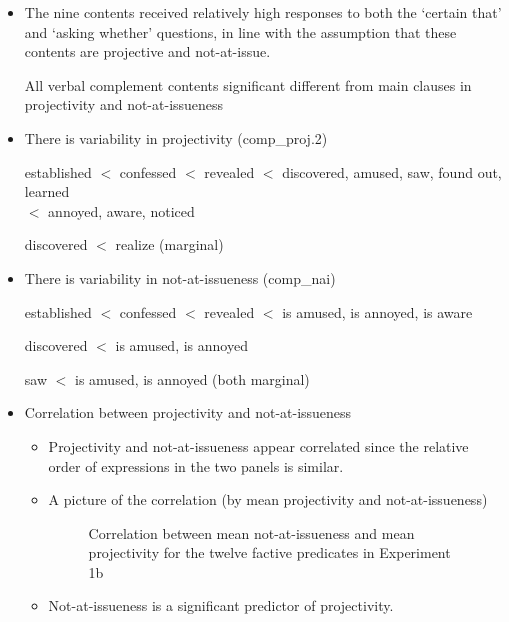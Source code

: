 \documentclass[11pt,fleqn]{article}
\newcommand{\6}{\mbox{$[\hspace*{-.6mm}[$}}
\newcommand{\9}{\mbox{$]\hspace*{-.6mm}]$}}
\begin{document}
\begin{itemize}

\item The nine contents received relatively high responses to both the `certain that' and `asking whether' questions, in line with the assumption that these contents are projective and not-at-issue. 

All verbal complement contents significant different from main clauses in projectivity and not-at-issueness

\item There is variability in projectivity (comp\_proj.2)

established $<$ confessed $<$ revealed $<$ discovered, amused, saw, found out, learned \\ \hspace*{.2cm} \hfill $<$ annoyed, aware, noticed

discovered $<$ realize (marginal)

\item There is variability in not-at-issueness (comp\_nai)

established $<$ confessed $<$ revealed $<$ is amused, is annoyed, is aware

discovered $<$ is amused, is annoyed

saw $<$ is amused, is annoyed (both marginal)

\item Correlation between projectivity and not-at-issueness

\begin{itemize}

\item Projectivity and not-at-issueness appear correlated since the relative order of expressions in the two panels is similar. 

\item A picture of the correlation (by mean projectivity and not-at-issueness)

\begin{figure}[!h]

\begin{center}

\end{center}

\caption{Correlation between mean not-at-issueness and mean projectivity for the twelve factive predicates in Experiment 1b}\label{f-corr2a}
\end{figure}

\item Not-at-issueness is a significant predictor of projectivity.


\end{itemize}

\end{itemize}
\end{document}
